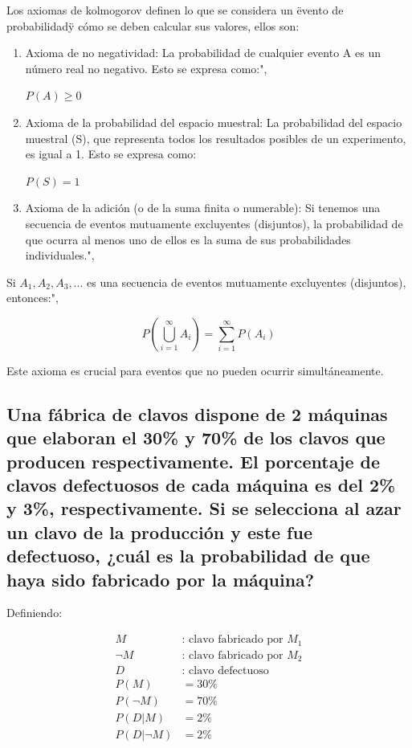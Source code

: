 \documentclass[11pt]{article}
\begin{document}
Los axiomas de kolmogorov definen lo que se considera un \"evento de probabilidad\" y cómo se deben calcular sus valores, ellos son:

\begin{enumerate}

\item  Axioma de no negatividad: La probabilidad de cualquier evento A es un número real no negativo. Esto se expresa como:\n",

$ P(A) \geq 0 $

\item Axioma de la probabilidad del espacio muestral: La probabilidad del espacio muestral (S), que representa todos los resultados posibles de un experimento, es igual a 1. Esto se expresa como:

$ P(S) = 1$

\item Axioma de la adición (o de la suma finita o numerable): Si tenemos una secuencia de eventos mutuamente excluyentes (disjuntos), la probabilidad de que ocurra al menos uno de ellos es la suma de sus probabilidades individuales.\n",
\end{enumerate}

Si $A_1, A_2, A_3, ...$ es una secuencia de eventos mutuamente excluyentes (disjuntos), entonces:\n",

$$P(\bigcup_{i=1}^{\infty} A_i) = \sum_{i=1}^{\infty} P(A_i)$$

Este axioma es crucial para eventos que no pueden ocurrir simultáneamente.

    \hypertarget{fabrica}{%
\subsection{Una fábrica de clavos dispone de 2 máquinas que elaboran el 30\% y 70\% de los clavos que producen respectivamente. El porcentaje de clavos defectuosos de cada máquina es del 2\% y 3\%, respectivamente. Si  se selecciona al azar un clavo de la producción y este fue defectuoso, ¿cuál es la probabilidad de que haya sido fabricado por la máquina?}\label{observe-la-siguiente-base-de-conocimiento}}

Definiendo:

\[
\begin{align*}

M & \text{:  clavo fabricado por } M_{1} \\
\neg M & \text{:  clavo fabricado por }M_{2} \\ 
D & \text{: clavo defectuoso} \\
P(M) & = 30\%  \\
P(\neg M) & = 70\% \\
P(D|M) & = 2\% \\
P(D|\neg M) & = 2\%

\end{align*}
\]
\end{document}
